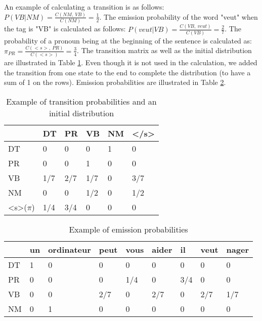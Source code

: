 \documentclass{KBook}
\begin{document}
An example of calculating a transition is as follows: $P(VB | NM) = \frac{C(NM,\ VB)}{C(NM)} = \frac{1}{2}$. The emission probability of the word "veut" when the tag is "VB" is calculated as follows: $P(veut | VB) = \frac{C(VB,\ veut)}{C(VB)} = \frac{2}{7}$. The probability of a pronoun being at the beginning of the sentence is calculated as: $\pi_{PR} = \frac{C(<s>,\ PR)}{C(<s>)} = \frac{3}{4}$. The transition matrix as well as the initial distribution are illustrated in Table \ref{tab:hmm-trans-init}. Even though it is not used in the calculation, we added the transition from one state to the end to complete the distribution (to have a sum of 1 on the rows). Emission probabilities are illustrated in Table \ref{tab:hmm-emission}.

\begin{table}[ht]
	\centering\footnotesize
	\begin{tabular}{llllll}
		\cline{2-6}\noalign{\vskip\doublerulesep
			\vskip-\arrayrulewidth}\cline{2-6}
		& DT & PR & VB & NM & \textless/s\textgreater\\
		\hline
		DT  &  0  &  0   &  0   &   1  &  0  \\
		PR &  0  &  0   &   1  &  0   &  0  \\
		VB & 1/7 & 2/7  & 1/7  &  0   & 3/7 \\
		NM &  0  &  0   & 1/2  &   0  &  1/2 \\
		\hline
		\textless s\textgreater ($\pi$) &  1/4  &  3/4   & 0  &   0  &  0 \\
		\hline\hline
	\end{tabular}
	\caption[Example of transition probabilities and an initial distribution]{Example of transition probabilities and an initial distribution \label{tab:hmm-trans-init}}
\end{table}

\begin{table}[ht]
	\centering\footnotesize
	\begin{tabular}{lllllllll}
		\cline{2-9}\noalign{\vskip\doublerulesep
			\vskip-\arrayrulewidth}\cline{2-9}
		& un & ordinateur & peut & vous & aider & il & veut & nager \\
		\hline
		DT  &  1 &  0         &  0   &   0  &  0    & 0  & 0    & 0 \\
		PR &   0 &  0         &  0   & 1/4  &  0    &3/4 & 0    & 0 \\
		VB &   0 &  0         & 2/7  &   0  &  2/7  & 0  & 2/7  & 1/7 \\
		NM &   0 &  1         &  0   &   0  &  0    & 0  & 0    & 0 \\
		\hline\hline
	\end{tabular}
	\caption[Example of emission probabilities]{Example of emission probabilities \label{tab:hmm-emission}}
\end{table}
\end{document}
